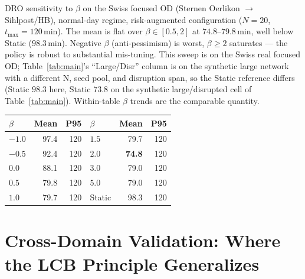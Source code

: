 \documentclass[opre,dblanonrev]{informs4}
\begin{document}
\begin{APPENDICES}
\begin{table}
\TABLE
{DRO sensitivity to $\beta$ on the Swiss focused OD
(Sternen Oerlikon $\to$ Sihlpost/HB), normal-day regime,
risk-augmented configuration ($N{=}20$, $t_{\max}{=}120$\,min). The mean is
flat over $\beta\in[0.5, 2]$ at $74.8$--$79.8$\,min, well below
Static ($98.3$\,min). Negative $\beta$ (anti-pessimism) is
worst, $\beta\!\geq\!2$ saturates --- the policy is robust
to substantial mis-tuning. This sweep is on the Swiss real
focused OD; Table~\ref{tab:main}'s ``Large/Disr'' column is on
the synthetic large network with a different N, seed pool, and
disruption span, so the Static reference differs (Static $98.3$
here, Static $73.8$ on the synthetic large/disrupted cell of
Table~\ref{tab:main}). Within-table $\beta$ trends are the
comparable quantity.\label{tab:beta}}
{\begin{tabular}{lrr|lrr}
\toprule
$\beta$ & Mean & P95 & $\beta$ & Mean & P95 \\
\midrule
$-1.0$ & 97.4 & 120 & $1.5$ & 79.7 & 120 \\
$-0.5$ & 92.4 & 120 & $2.0$ & \textbf{74.8} & 120 \\
$0.0$ & 88.1 & 120 & $3.0$ & 79.0 & 120 \\
$0.5$ & 79.8 & 120 & $5.0$ & 79.0 & 120 \\
$1.0$ & 79.7 & 120 & Static & 98.3 & 120 \\
\bottomrule
\end{tabular}}
{}
\end{table}


\section{Cross-Domain Validation: Where the LCB Principle Generalizes}
\label{ec:cross_domain}


\end{APPENDICES}
\end{document}
